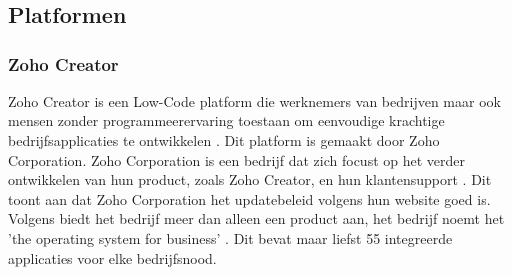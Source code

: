 \chapter{}%
\label{ch:evaluatie-en-selectie-van-alternatieven}
\section{Platformen}%
\label{sec:platformen}

\subsection{Zoho Creator}%
\label{subsec:zoho-creator}

Zoho Creator is een Low-Code platform die werknemers van bedrijven maar ook mensen zonder programmeerervaring toestaan
om eenvoudige krachtige bedrijfsapplicaties te ontwikkelen \autocite{Computer2022}. Dit platform is gemaakt door Zoho Corporation.
Zoho Corporation is een bedrijf dat zich focust op het verder ontwikkelen van hun product, zoals Zoho Creator, en hun klantensupport \autocite{ZohoCorporation2024a}. Dit toont aan dat Zoho Corporation
het updatebeleid volgens hun website goed is. Volgens \textcite{ZohoCorporation2024a} biedt het bedrijf meer dan alleen een product aan, het bedrijf noemt het 'the operating system for business' \autocite{ZohoCorporation2024a}.
Dit bevat maar liefst 55 integreerde applicaties voor elke bedrijfsnood.

